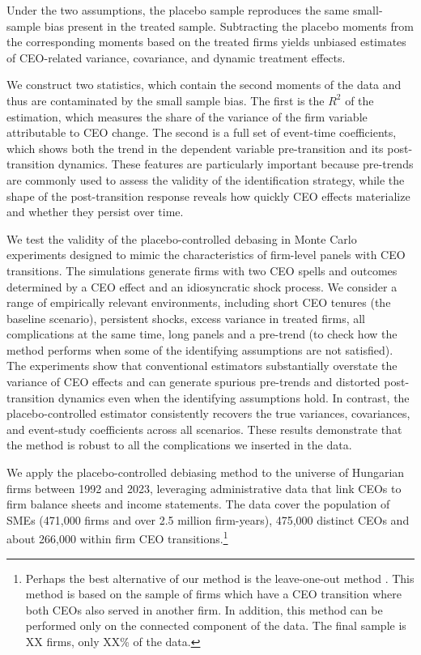 \documentclass[sigconf,nonacm]{acmart}
\begin{document}
Under the two assumptions, the placebo sample reproduces the same small-sample bias present in the treated sample. Subtracting the placebo moments from the corresponding moments based on the treated firms yields unbiased estimates of CEO-related variance, covariance, and dynamic treatment effects.

We construct two statistics, which contain the second moments of the data and thus are contaminated by the small sample bias. The first is the $R^2$ of the estimation, which measures the share of the variance of the firm variable attributable to CEO change. The second is a full set of event-time coefficients, which shows both the trend in the dependent variable pre-transition and its post-transition dynamics. These features are particularly important because pre-trends are commonly used to assess the validity of the identification strategy, while the shape of the post-transition response reveals how quickly CEO effects materialize and whether they persist over time. 

We test the validity of the placebo-controlled debasing in Monte Carlo experiments designed to mimic the characteristics of firm-level panels with CEO transitions. The simulations generate firms with two CEO spells and outcomes determined by a CEO effect and an idiosyncratic shock process. We consider a range of empirically relevant environments, including short CEO tenures (the baseline scenario), persistent shocks, excess variance in treated firms, all complications at the same time, long panels and a pre-trend (to check how the method performs when some of the identifying assumptions are not satisfied). The experiments show that conventional estimators substantially overstate the variance of CEO effects and can generate spurious pre-trends and distorted post-transition dynamics even when the identifying assumptions hold. In contrast, the placebo-controlled estimator consistently recovers the true variances, covariances, and event-study coefficients across all scenarios. These results demonstrate that the method is robust to all the complications we inserted in the data.

We apply the placebo-controlled debiasing method to the universe of Hungarian firms between 1992 and 2023, leveraging administrative data that link CEOs to firm balance sheets and income statements. The data cover the population of SMEs (471,000 firms and over 2.5 million firm-years), 475,000 distinct CEOs and about 266,000 within firm CEO transitions.\footnote{Perhaps the best alternative of our method is the leave-one-out method \citep{kline2020leave}. This method is based on the sample of firms which have a CEO transition where both CEOs also served in another firm. In addition, this method can be performed only on the connected component of the data. The final sample is XX firms, only XX\% of the data.}
\end{document}
